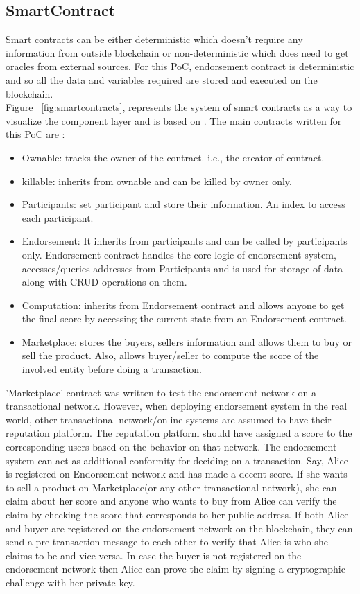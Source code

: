 \subsection{SmartContract} 
Smart contracts can be either deterministic which doesn't require any
information from outside blockchain or non-deterministic which does need to get
oracles from external sources\cite{alharby2017blockchain}. For this PoC,
endorsement contract is deterministic and so all the data and variables
required are stored and executed on the blockchain. \\
Figure ~\ref{fig:smartcontracts}, represents the system of smart contracts as a
way to visualize the component layer and is based on \cite{delmolino2016step}. 
The main contracts written for this PoC are : 
\begin{itemize}
	\item Ownable: tracks the owner of the contract. i.e., the creator of
		contract. 
	\item killable: inherits from ownable and can be killed by owner only. 
	\item Participants: set participant and store their information. An index
		to access each participant. 
	\item Endorsement: It inherits from participants and can be called by
		participants only. Endorsement contract handles the core logic of
		endorsement system, accesses/queries addresses from Participants and is
		used for storage of data along with CRUD operations on them.  
	\item Computation: inherits from Endorsement contract and allows anyone to
		get the final score by accessing the current state from an Endorsement
		contract.
	\item Marketplace: stores the buyers, sellers information and allows them
		to buy or sell the product. Also, allows buyer/seller to compute the
		score of the involved entity before doing a transaction.  
\end{itemize}
'Marketplace' contract was written to test the endorsement network on a
transactional network. However, when deploying endorsement system in the real
world, other transactional network/online systems are assumed to have their
reputation platform. The reputation platform should have assigned a score to
the corresponding users based on the behavior on that network. The endorsement
system can act as additional conformity for deciding on a transaction. Say,
Alice is registered on Endorsement network and has made a decent score. If she
wants to sell a product on Marketplace(or any other transactional network), she
can claim about her score and anyone who wants to buy from Alice can verify the
claim by checking the score that corresponds to her public address. If both
Alice and buyer are registered on the endorsement network on the blockchain,
they can send a pre-transaction message to each other to verify that Alice is
who she claims to be and vice-versa. In case the buyer is not registered on the
endorsement network then Alice can prove the claim by signing a cryptographic
challenge with her private key. 

